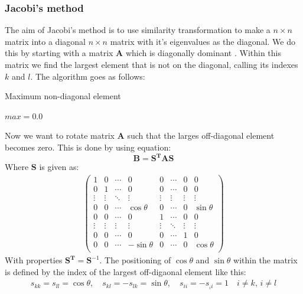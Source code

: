 \documentclass{article}
\newcommand\ppmat[1]{\begin{pmatrix}#1\end{pmatrix}}
\newcommand{\V}[1]{\mathbf{#1}}
\begin{document}
\subsubsection{Jacobi's method}
The aim of Jacobi's method is to use similarity transformation to make a $n \times n$ matrix into a diagonal $n \times n$ matrix with it's eigenvalues as the diagonal. We do this by starting with a matrix $\V{A}$ which is diagonally dominant \cite{DDMatrix}. Within this matrix we find the largest element that is not on the diagonal, calling its indexes $k$ and $l$. The algorithm goes as follows:
\begin{algorithm}[H]
\small
\caption{Maximum non-diagonal element}\label{alg:max_offdiag}
\begin{algorithmic}[1]
\State $max = 0.0$
\EndIf
\EndFor
\EndFor
\end{algorithmic}
\end{algorithm}
Now we want to rotate matrix $\V{A}$ such that the larges off-diagonal element becomes zero. This is done by using equation:
\begin{equation}
\V{B} = \V{S}^{\V{T}} \V{A} \V{S}
\label{eq:symtrans}
\end{equation}
Where $\V{S}$ is given as:
\begin{align*}
\ppmat{1 & 0 & \cdots & 0 & 0 & \cdots & 0 & 0 \\
	   0 & 1 & \cdots & 0 & 0 & \cdots & 0 & 0 \\
	   \vdots & \vdots & \ddots & \vdots & \vdots & \vdots & \vdots & \vdots \\
	   0 & 0 & \cdots & \cos \theta & 0 & \cdots & 0 & \sin \theta \\
	   0 & 0 & \cdots & 0 & 1 & \cdots & 0 & 0 \\
	   \vdots & \vdots & \vdots & \vdots & \vdots & \ddots & \vdots & \vdots \\
	   0 & 0 & \cdots & 0 & 0 & \cdots & 1 & 0 \\
	   0 & 0 & \cdots & -\sin \theta & 0 & \cdots & 0 & \cos \theta \\}
\end{align*}
With properties $\V{S}^{\V{T}} = \V{S}^{-1}$.
The positioning of $\cos \theta$ and $\sin \theta$ within the matrix is defined by the index of the largest off-digaonal element like this:
\begin{align*}
s_{kk} = s_{ll} = \cos\theta , \quad s_{kl} = -s_{lk} = \sin \theta, \quad s_{ii} = -s_{_ii} = 1 \quad i \neq k, \, i \neq l
\end{align*}
\end{document}
